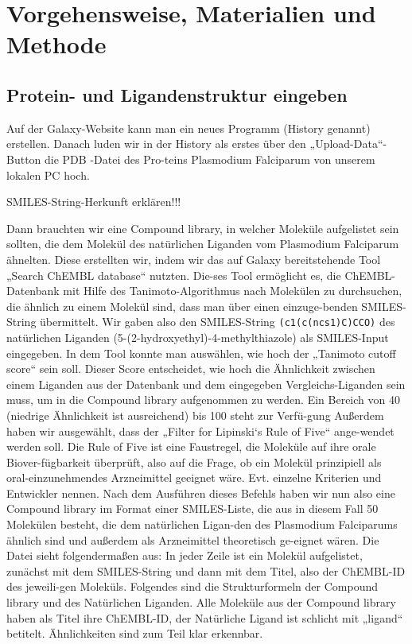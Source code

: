\documentclass[11pt]{article}
\begin{document}
    \section{Vorgehensweise, Materialien und Methode}\label{sec:vorgehensweise-materialien-und-methode}

    \subsection{Protein- und Ligandenstruktur eingeben}\label{subsec:protein--und-ligandenstruktur-eingeben}

    Auf der Galaxy-Website kann man ein neues Programm (History genannt) erstellen. Danach luden wir in der History als erstes über den „Upload-Data“-Button die PDB -Datei des Pro-teins Plasmodium Falciparum von unserem lokalen PC hoch.

    SMILES-String-Herkunft erklären!!!

    Dann brauchten wir eine Compound library, in welcher Moleküle aufgelistet sein sollten, die dem Molekül des natürlichen Liganden vom Plasmodium Falciparum ähnelten. Diese erstellten wir, indem wir das auf Galaxy bereitstehende Tool „Search ChEMBL database“ nutzten. Die-ses Tool ermöglicht es, die ChEMBL-Datenbank mit Hilfe des Tanimoto-Algorithmus nach Molekülen zu durchsuchen, die ähnlich zu einem Molekül sind, dass man über einen einzuge-benden SMILES-String übermittelt. Wir gaben also den SMILES-String \texttt{(c1(c(ncs1)C)CCO)} des natürlichen Liganden (5-(2-hydroxyethyl)-4-methylthiazole) als SMILES-Input eingegeben.
    In dem Tool konnte man auswählen, wie hoch der „Tanimoto cutoff score“ sein soll. Dieser Score entscheidet, wie hoch die Ähnlichkeit zwischen einem Liganden aus der Datenbank und dem eingegeben Vergleichs-Liganden sein muss, um in die Compound library aufgenommen zu werden. Ein Bereich von 40 (niedrige Ähnlichkeit ist ausreichend) bis 100 steht zur Verfü-gung Außerdem haben wir ausgewählt, dass der „Filter for Lipinski‘s Rule of Five“ ange-wendet werden soll. Die Rule of Five ist eine Faustregel, die Moleküle auf ihre orale Biover-fügbarkeit überprüft, also auf die Frage, ob ein Molekül prinzipiell als oral-einzunehmendes Arzneimittel geeignet wäre.
    Evt. einzelne Kriterien und Entwickler nennen.
    Nach dem Ausführen dieses Befehls haben wir nun also eine Compound library im Format einer SMILES-Liste, die aus in diesem Fall 50 Molekülen besteht, die dem natürlichen Ligan-den des Plasmodium Falciparums ähnlich sind und außerdem als Arzneimittel theoretisch ge-eignet wären. Die Datei sieht folgendermaßen aus: In jeder Zeile ist ein Molekül aufgelistet, zunächst mit dem SMILES-String und dann mit dem Titel, also der ChEMBL-ID des jeweili-gen Moleküls.
    Folgendes sind die Strukturformeln der Compound library und des Natürlichen Liganden. Alle Moleküle aus der Compound library haben als Titel ihre ChEMBL-ID, der Natürliche Ligand ist schlicht mit „ligand“ betitelt. Ähnlichkeiten sind zum Teil klar erkennbar.
\end{document}
